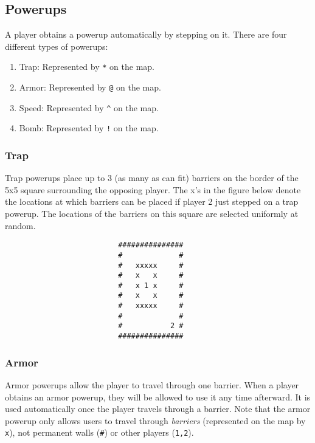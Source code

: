 \documentclass{article}
\begin{document}
    \subsection{Powerups}
    A player obtains a powerup automatically by stepping on it. There are four different types of powerups:
    \begin{enumerate}
    	\item Trap: Represented by \texttt{*} on the map.
        \item Armor: Represented by \texttt{@} on the map.
        \item Speed: Represented by \texttt{\^} on the map.
        \item Bomb: Represented by \texttt{!} on the map.
    \end{enumerate}

    \subsubsection{Trap}
    Trap powerups place up to 3 (as many as can fit) barriers on the border of the 5x5 square surrounding the opposing player.
    The x's in the figure below denote the locations at which barriers can be placed if player 2 just stepped on a trap powerup.
    The locations of the barriers on this square are selected uniformly at random.

    \begin{verbatim}
                          ###############
                          #             #
                          #   xxxxx     #
                          #   x   x     #
                          #   x 1 x     #
                          #   x   x     #
                          #   xxxxx     #
                          #             #
                          #           2 #
                          ###############
    \end{verbatim}

    \subsubsection{Armor}
    Armor powerups allow the player to travel through one barrier. When a player obtains an armor powerup, they will be allowed to use it any time afterward. It is used automatically once the player travels through a barrier. Note that the armor powerup only allows users to travel through \textit{barriers} (represented on the map by \texttt{x}), not permanent walls (\texttt{\#}) or other players (\texttt{1,2}).
\end{document}
